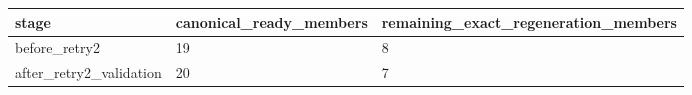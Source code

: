 \begin{tabular}{lll}
\toprule
stage & canonical\_ready\_members & remaining\_exact\_regeneration\_members \\
\midrule
before\_retry2 & 19 & 8 \\
after\_retry2\_validation & 20 & 7 \\
\bottomrule
\end{tabular}
